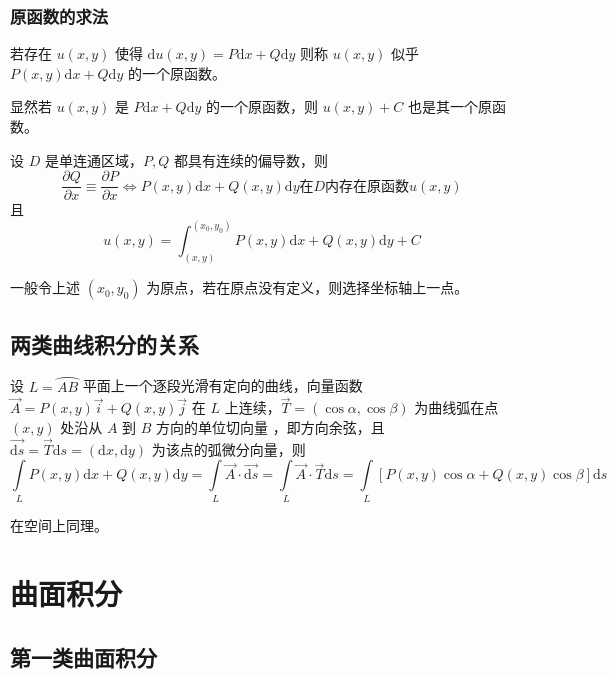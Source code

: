 \subsubsection{原函数的求法}

\begin{Def}[原函数]

    若存在 $ u(x,y) $ 使得 $ \mathrm{d}u(x,y) = P\mathrm{d}x+Q\mathrm{d}y $ 则称 $ u(x,y) $ 
    似乎 $ P(x,y)\mathrm{d}x+Q\mathrm{d}y $ 的一个原函数。
\end{Def}

显然若 $ u(x,y) $ 是  $ P\mathrm{d}x+Q\mathrm{d}y $ 的一个原函数，则 $ u(x,y) + C $ 
也是其一个原函数。

\begin{Theo}[原函数存在定理]

    设 $ D $ 是单连通区域，$ P,Q $ 都具有连续的偏导数，则$$
        \dfrac{\partial Q}{\partial x} \equiv \dfrac{\partial P}{\partial x}
        \Leftrightarrow
        P(x,y)\mathrm{d}x + Q(x,y)\mathrm{d}y \textrm{在}D\textrm{内存在原函数} u(x,y)
    $$ 
    且 $$
        u(x,y) = \int_{(x,y)}^{(x_0,y_0)}P(x,y)\mathrm{d}x+Q(x,y)\mathrm{d}y + C
    $$ 
\end{Theo}

一般令上述 $ (x_0,y_0) $ 为原点，若在原点没有定义，则选择坐标轴上一点。

\subsection{两类曲线积分的关系}

设 $ L = \wideparen{AB} $ 平面上一个逐段光滑有定向的曲线，向量函数 $ \vec A = P(x,y)\vec i + Q(x,y)\vec j $ 
在 $ L $ 上连续，$ \vec T = (\cos\alpha,\cos\beta) $ 为曲线弧在点 $ (x,y) $ 处沿从 $ A $ 到 $ B $ 方向的单位切向量
，即方向余弦，且 $ \vec{\mathrm{d}s}=\vec T\mathrm{d}s = (\mathrm{d}x,\mathrm{d}y) $ 
为该点的弧微分向量，则
$$
    \int\limits_L P(x,y)\mathrm{d}x + Q(x,y)\mathrm{d}y = 
    \int\limits_L \vec A ·\vec{\mathrm{d}s} = 
    \int\limits_L \vec A ·\vec{T}\mathrm{d}s = 
    \int\limits_L \left[P(x,y)\cos\alpha+Q(x,y)\cos\beta \right]\mathrm{d}s
$$ 

在空间上同理。

\section{曲面积分}

\subsection{第一类曲面积分}


